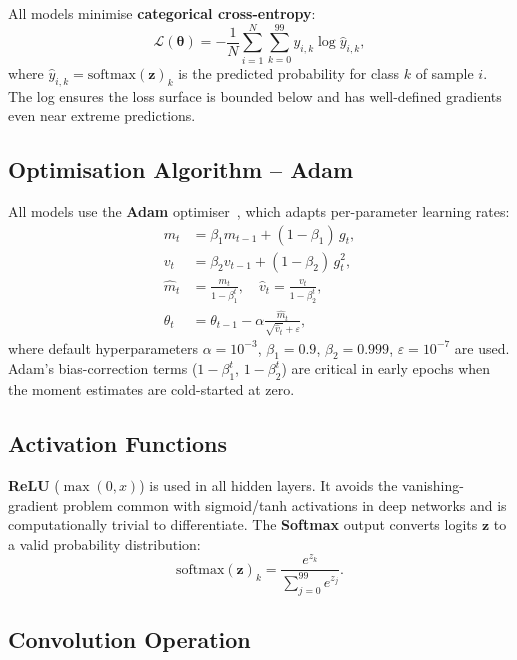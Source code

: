 \documentclass[12pt,a4paper]{article}
\begin{document}
All models minimise \textbf{categorical cross-entropy}:
\begin{equation}
    \mathcal{L}(\boldsymbol{\theta}) = -\frac{1}{N}\sum_{i=1}^{N}\sum_{k=0}^{99} y_{i,k} \log \hat{y}_{i,k},
\end{equation}
where $\hat{y}_{i,k} = \text{softmax}(\mathbf{z})_k$ is the predicted probability for class $k$ of sample $i$. The log ensures the loss surface is bounded below and has well-defined gradients even near extreme predictions.

\subsection{Optimisation Algorithm -- Adam}

All models use the \textbf{Adam} optimiser~\cite{adam}, which adapts per-parameter learning rates:
\begin{align}
    m_t &= \beta_1 m_{t-1} + (1-\beta_1)\,g_t, \\
    v_t &= \beta_2 v_{t-1} + (1-\beta_2)\,g_t^2, \\
    \hat{m}_t &= \frac{m_t}{1-\beta_1^t}, \quad \hat{v}_t = \frac{v_t}{1-\beta_2^t}, \\
    \theta_t &= \theta_{t-1} - \alpha \frac{\hat{m}_t}{\sqrt{\hat{v}_t}+\varepsilon},
\end{align}
where default hyperparameters $\alpha=10^{-3}$, $\beta_1=0.9$, $\beta_2=0.999$, $\varepsilon=10^{-7}$ are used. Adam's bias-correction terms ($1-\beta_1^t$, $1-\beta_2^t$) are critical in early epochs when the moment estimates are cold-started at zero.

\subsection{Activation Functions}

\textbf{ReLU} ($\max(0, x)$) is used in all hidden layers. It avoids the vanishing-gradient problem common with sigmoid/tanh activations in deep networks and is computationally trivial to differentiate. The \textbf{Softmax} output converts logits $\mathbf{z}$ to a valid probability distribution:
\begin{equation}
    \text{softmax}(\mathbf{z})_k = \frac{e^{z_k}}{\sum_{j=0}^{99} e^{z_j}}.
\end{equation}

\subsection{Convolution Operation}
\end{document}

